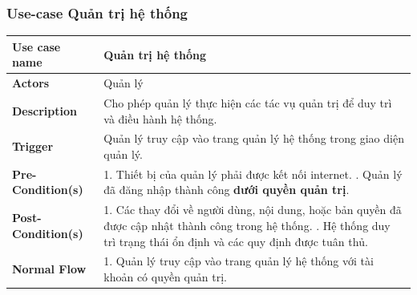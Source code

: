 \documentclass[a4paper]{article}
\begin{document}
\subsubsection{Use-case Quản trị hệ thống}
\begin{table}[H]
	\centering
	\renewcommand{\arraystretch}{1.3} %
	\begin{tabularx}{\textwidth}{|l|X|}
		\hline
		\textbf{Use case name} & Quản trị hệ thống                                                                                                                                                                                                  \\ \hline
		\textbf{Actors}        & Quản lý                                                                                                                                                                                                            \\ \hline
		\textbf{Description}   & Cho phép quản lý thực hiện các tác vụ quản trị để duy trì và điều hành hệ thống.                                                                                                                                   \\ \hline
		\textbf{Trigger}       & Quản lý truy cập vào trang quản lý hệ thống trong giao diện quản lý.                                                                                                                                               \\ \hline
		\textbf{Pre-Condition(s)}
		                       & 1. Thiết bị của quản lý phải được kết nối internet. \newline
		2. Quản lý đã đăng nhập thành công \textbf{dưới quyền quản trị}.                                                                                                                                                                            \\ \hline
		\textbf{Post-Condition(s)}
		                       & 1. Các thay đổi về người dùng, nội dung, hoặc bản quyền đã được cập nhật thành công trong hệ thống. \newline
		2. Hệ thống duy trì trạng thái ổn định và các quy định được tuân thủ.                                                                                                                                                                       \\ \hline
		\textbf{Normal Flow}
		                       & 1. Quản lý truy cập vào trang quản lý hệ thống với tài khoản có quyền quản trị. \newline

\end{tabularx}
\end{table}
\end{document}
